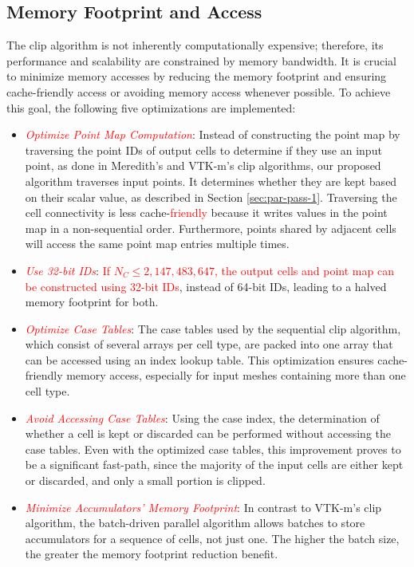 \documentclass{egpubl}
\newcommand*{\fix}[1]{\textcolor{red}{#1}}
\begin{document}
\subsection{Memory Footprint and Access}
\label{sec:memory-footprint-and-access}

The clip algorithm is not inherently computationally expensive; therefore, its performance and scalability are constrained by memory bandwidth. It is crucial to minimize memory accesses by reducing the memory footprint and ensuring cache-friendly access or avoiding memory access whenever possible. To achieve this goal, the following five optimizations are implemented:

\begin{itemize}
    \item \fix{\textit{Optimize Point Map Computation}}: Instead of constructing the point map by traversing the point IDs of output cells to determine if they use an input point, as done in Meredith's and VTK-m's clip algorithms, our proposed algorithm traverses input points. It determines whether they are kept based on their scalar value, as described in Section \ref{sec:par-pass-1}. Traversing the cell connectivity is less cache-\fix{friendly} because it writes values in the point map in a non-sequential order. Furthermore, points shared by adjacent cells will access the same point map entries multiple times.
    \item \fix{\textit{Use 32-bit IDs}}: \fix{If $N_C \leq 2,147,483,647$, the output cells and point map can be constructed using 32-bit IDs}, instead of 64-bit IDs, leading to a halved memory footprint for both.
    \item \fix{\textit{Optimize Case Tables}}: The case tables used by the sequential clip algorithm, which consist of several arrays per cell type, are packed into one array that can be accessed using an index lookup table. This optimization ensures cache-friendly memory access, especially for input meshes containing more than one cell type. 
    \item \fix{\textit{Avoid Accessing Case Tables}}: Using the case index, the determination of whether a cell is kept or discarded can be performed without accessing the case tables. Even with the optimized case tables, this improvement proves to be a significant fast-path, since the majority of the input cells are either kept or discarded, and only a small portion is clipped.
    \item \fix{\textit{Minimize Accumulators' Memory Footprint}}: In contrast to VTK-m's clip algorithm, the batch-driven parallel algorithm allows batches to store accumulators for a sequence of cells, not just one. The higher the batch size, the greater the memory footprint reduction benefit.
\end{itemize}
\end{document}
